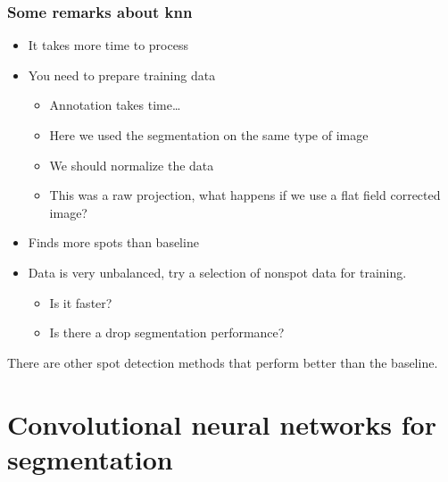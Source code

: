 \documentclass[letterpaper,10pt,english]{sphinxmanual}
\begin{document}
\noindent{}


\subsection{Some remarks about k\sphinxhyphen{}nn}
\label{\detokenize{ML4NeutronImageSegmentation:some-remarks-about-k-nn}}\begin{itemize}
\item {} 
It takes more time to process

\item {} 
You need to prepare training data
\begin{itemize}
\item {} 
Annotation takes time…

\item {} 
Here we used the segmentation on the same type of image

\item {} 
We should normalize the data

\item {} 
This was a raw projection, what happens if we use a flat field corrected image?

\end{itemize}

\item {} 
Finds more spots than baseline

\item {} 
Data is very unbalanced, try a selection of non\sphinxhyphen{}spot data for training.
\begin{itemize}
\item {} 
Is it faster?

\item {} 
Is there a drop segmentation performance?

\end{itemize}

\end{itemize}

 There are other spot detection methods that perform better than the baseline.


\chapter{Convolutional neural networks for segmentation}
\label{\detokenize{ML4NeutronImageSegmentation:convolutional-neural-networks-for-segmentation}}
\end{document}
